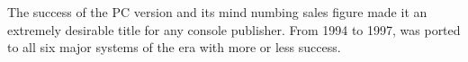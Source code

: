 The success of the PC version and its mind numbing sales figure made it an extremely desirable title for any console publisher. From 1994 to 1997, \doom was ported to all six major systems of the era with more or less success.\\
\par


